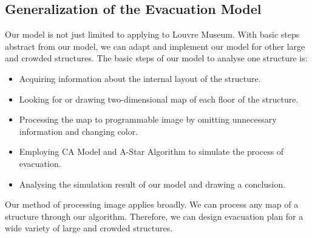 \documentclass{mcmthesis}
\begin{document}
\subsection{Generalization of the Evacuation Model}
Our model is not just limited to applying to Louvre Museum. With basic steps abstract from our model, we can adapt and implement our model for other large and crowded structures. The basic steps of our model to analyse one structure is:
\begin{itemize}
\item Acquiring information about the internal layout of the structure.
\item Looking for or drawing two-dimensional map of each floor of the structure.
\item Processing the map to programmable image by omitting unnecessary information and changing color. 
\item Employing CA Model and A-Star Algorithm to simulate the process of evacuation.
\item Analysing the simulation result of our model and drawing a conclusion. 
\end{itemize}
Our method of processing image applies broadly. We can process any map of a structure through our algorithm. Therefore, we can design evacuation plan for a wide variety of large and crowded structures.	
\end{document}
